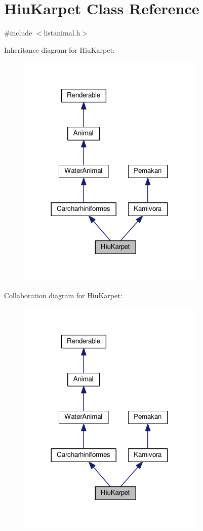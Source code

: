 \hypertarget{classHiuKarpet}{}\section{Hiu\+Karpet Class Reference}
\label{classHiuKarpet}


{\ttfamily \#include $<$listanimal.\+h$>$}



Inheritance diagram for Hiu\+Karpet\+:
\nopagebreak
\begin{figure}[H]
\begin{center}
\leavevmode
\includegraphics[width=252pt]{classHiuKarpet__inherit__graph}
\end{center}
\end{figure}


Collaboration diagram for Hiu\+Karpet\+:
\nopagebreak
\begin{figure}[H]
\begin{center}
\leavevmode
\includegraphics[width=252pt]{classHiuKarpet__coll__graph}
\end{center}
\end{figure}
